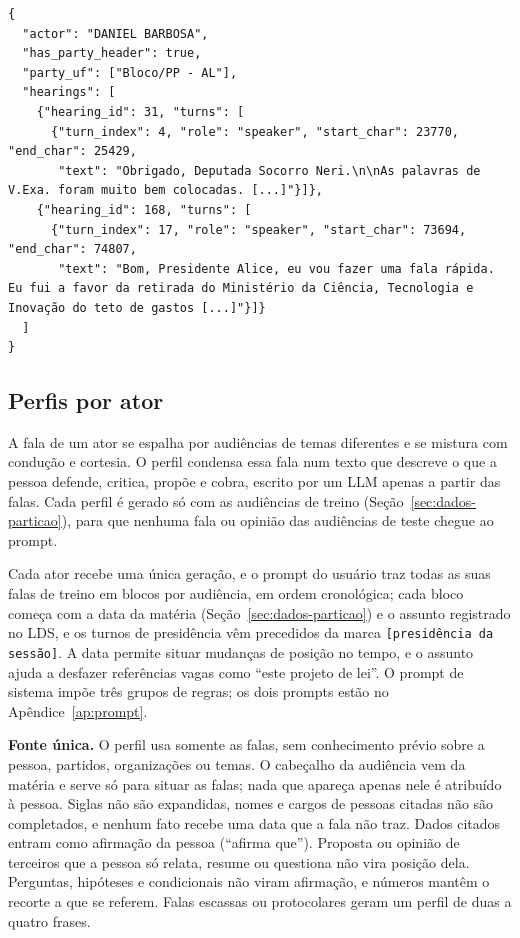\begin{lstlisting}[float=tbp,caption={Registro de falas por ator, restrito às audiências de treino. Os textos
foram truncados em {[\ldots]}, e o campo com a concatenação dos turnos de cada audiência foi omitido.},
label=lst:ator]
{
  "actor": "DANIEL BARBOSA",
  "has_party_header": true,
  "party_uf": ["Bloco/PP - AL"],
  "hearings": [
    {"hearing_id": 31, "turns": [
      {"turn_index": 4, "role": "speaker", "start_char": 23770, "end_char": 25429,
       "text": "Obrigado, Deputada Socorro Neri.\n\nAs palavras de V.Exa. foram muito bem colocadas. [...]"}]},
    {"hearing_id": 168, "turns": [
      {"turn_index": 17, "role": "speaker", "start_char": 73694, "end_char": 74807,
       "text": "Bom, Presidente Alice, eu vou fazer uma fala rápida. Eu fui a favor da retirada do Ministério da Ciência, Tecnologia e Inovação do teto de gastos [...]"}]}
  ]
}
\end{lstlisting}

\subsection{Perfis por ator}
\label{sec:metodo-perfis}

A fala de um ator se espalha por audiências de temas diferentes e se mistura com condução e
cortesia. O perfil condensa essa fala num texto que
descreve o que a pessoa defende, critica, propõe e cobra, escrito por um LLM apenas a partir das
falas. Cada perfil é gerado só com as audiências de treino (Seção~\ref{sec:dados-particao}), para que
nenhuma fala ou opinião das audiências de teste chegue ao prompt.

Cada ator recebe uma única geração, e o prompt do usuário traz todas as suas falas de treino em blocos
por audiência, em ordem cronológica; cada bloco começa com a data da
matéria (Seção~\ref{sec:dados-particao}) e o assunto registrado no LDS, e os turnos de presidência
vêm precedidos da marca \texttt{[presidência da sessão]}. A data permite situar mudanças de posição
no tempo, e o assunto ajuda a desfazer referências vagas como ``este projeto de lei''. O prompt de
sistema impõe três grupos de regras; os dois prompts estão no Apêndice~\ref{ap:prompt}.

\textbf{Fonte única.} O perfil usa somente as falas, sem conhecimento prévio sobre a pessoa,
partidos, organizações ou temas. O cabeçalho da audiência vem da matéria e serve só para situar as
falas; nada que apareça apenas nele é atribuído à pessoa. Siglas não são expandidas, nomes e cargos
de pessoas citadas não são completados, e nenhum fato recebe uma data que a fala não traz. Dados
citados entram como afirmação da pessoa (``afirma que''). Proposta ou opinião de terceiros que a
pessoa só relata, resume ou questiona não vira posição dela. Perguntas, hipóteses e condicionais não
viram afirmação, e números mantêm o recorte a que se referem. Falas escassas ou protocolares geram
um perfil de duas a quatro frases.

